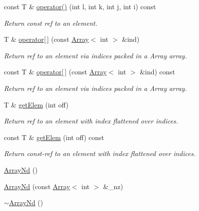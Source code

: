 \begin{DoxyCompactItemize}
const T \& \mbox{\hyperlink{classADAT_1_1ArrayNd_aa2f8e4f6fa9a05745538791ba4f70aff}{operator()}} (int l, int k, int j, int i) const
\begin{DoxyCompactList}\small\item\em Return const ref to an element. \end{DoxyCompactList}\item 
T \& \mbox{\hyperlink{classADAT_1_1ArrayNd_a5689e9a64be5914877dc3882cc68a283}{operator\mbox{[}$\,$\mbox{]}}} (const \mbox{\hyperlink{classXMLArray_1_1Array}{Array}}$<$ int $>$ \&ind)
\begin{DoxyCompactList}\small\item\em Return ref to an element via indices packed in a Array array. \end{DoxyCompactList}\item 
const T \& \mbox{\hyperlink{classADAT_1_1ArrayNd_a3b7160cbd3939f68f4a23df8cc56d2df}{operator\mbox{[}$\,$\mbox{]}}} (const \mbox{\hyperlink{classXMLArray_1_1Array}{Array}}$<$ int $>$ \&ind) const
\begin{DoxyCompactList}\small\item\em Return ref to an element via indices packed in a Array array. \end{DoxyCompactList}\item 
T \& \mbox{\hyperlink{classADAT_1_1ArrayNd_abc5c56420a9625b236d4521acb083de2}{get\+Elem}} (int off)
\begin{DoxyCompactList}\small\item\em Return ref to an element with index flattened over indices. \end{DoxyCompactList}\item 
const T \& \mbox{\hyperlink{classADAT_1_1ArrayNd_a515368f71387996ee237309eb1f0cc2e}{get\+Elem}} (int off) const
\begin{DoxyCompactList}\small\item\em Return const-\/ref to an element with index flattened over indices. \end{DoxyCompactList}\item 
\mbox{\hyperlink{classADAT_1_1ArrayNd_aafdf6b588aa54b3d59b6952971bcdce4}{Array\+Nd}} ()
\item 
\mbox{\hyperlink{classADAT_1_1ArrayNd_aea668cd9a67b06d552e4acb9a7dec98c}{Array\+Nd}} (const \mbox{\hyperlink{classXMLArray_1_1Array}{Array}}$<$ int $>$ \&\+\_\+nz)
\item 
\mbox{\hyperlink{classADAT_1_1ArrayNd_a040990cb205b2c2b5eb2f5d0594408b9}{$\sim$\+Array\+Nd}} ()
\item 

\end{DoxyCompactItemize}
